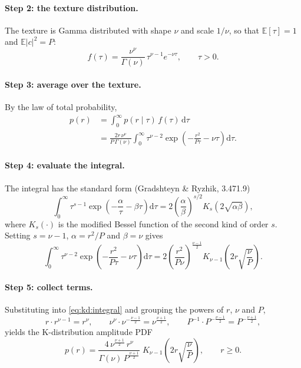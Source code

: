 \documentclass{article}
\begin{document}
\paragraph{Step 2: the texture distribution.}
The texture is Gamma distributed with shape $\nu$ and scale $1/\nu$, so that
$\mathbb E[\tau]=1$ and $\mathbb E|c|^2=P$:
\begin{equation}
  f(\tau) = \frac{\nu^{\nu}}{\Gamma(\nu)}\,\tau^{\nu-1}e^{-\nu\tau},
  \qquad \tau>0 .
  \label{eq:kd:gamma}
\end{equation}

\paragraph{Step 3: average over the texture.}
By the law of total probability,
\begin{align}
  p(r) &= \int_0^\infty p(r\mid\tau)\,f(\tau)\,\mathrm d\tau \nonumber\\
       &= \frac{2r\,\nu^{\nu}}{P\,\Gamma(\nu)}
          \int_0^\infty \tau^{\nu-2}
          \exp\!\left(-\frac{r^2}{P\tau}-\nu\tau\right)\mathrm d\tau .
  \label{eq:kd:integral}
\end{align}

\paragraph{Step 4: evaluate the integral.}
The integral has the standard form
(Gradshteyn \& Ryzhik, 3.471.9)
\begin{equation}
  \int_0^\infty \tau^{s-1}\exp\!\left(-\frac{\alpha}{\tau}-\beta\tau\right)\mathrm d\tau
  = 2\left(\frac{\alpha}{\beta}\right)^{s/2} K_s\!\left(2\sqrt{\alpha\beta}\right),
  \label{eq:kd:identity}
\end{equation}
where $K_s(\cdot)$ is the modified Bessel function of the second kind of
order $s$. Setting $s=\nu-1$, $\alpha=r^2/P$ and $\beta=\nu$ gives
\begin{equation}
  \int_0^\infty \tau^{\nu-2}
  \exp\!\left(-\frac{r^2}{P\tau}-\nu\tau\right)\mathrm d\tau
  = 2\left(\frac{r^2}{P\nu}\right)^{\frac{\nu-1}{2}}
    K_{\nu-1}\!\left(2r\sqrt{\frac{\nu}{P}}\right).
\end{equation}

\paragraph{Step 5: collect terms.}
Substituting into \eqref{eq:kd:integral} and grouping the powers of $r$,
$\nu$ and $P$,
\[
  r\cdot r^{\nu-1}=r^{\nu},\qquad
  \nu^{\nu}\cdot\nu^{-\frac{\nu-1}{2}}=\nu^{\frac{\nu+1}{2}},\qquad
  P^{-1}\cdot P^{-\frac{\nu-1}{2}}=P^{-\frac{\nu+1}{2}},
\]
yields the K-distribution amplitude PDF
\begin{equation}
  \boxed{\;
  p(r) = \frac{4\,\nu^{\frac{\nu+1}{2}}\,r^{\nu}}{\Gamma(\nu)\,P^{\frac{\nu+1}{2}}}\;
         K_{\nu-1}\!\left(2r\sqrt{\frac{\nu}{P}}\right),
         \qquad r\ge 0 . \;}
  \label{eq:kd:pdf}
\end{equation}
\end{document}
